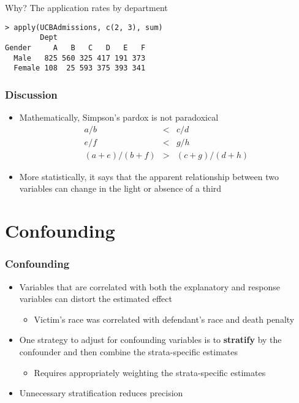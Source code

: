 \documentclass[aspectratio=169]{beamer}
\begin{document}
\begin{frame}[fragile]
Why? The application rates by department
\begin{verbatim}
> apply(UCBAdmissions, c(2, 3), sum)
        Dept
Gender     A   B   C   D   E   F
  Male   825 560 325 417 191 373
  Female 108  25 593 375 393 341
\end{verbatim}
\end{frame}

\begin{frame}\frametitle{Discussion}
\begin{itemize}
\item Mathematically, Simpson's pardox is not paradoxical
  \begin{eqnarray*}
    a / b & < & c / d\\
    e / f & < & g / h \\
    (a + e) / (b + f) & > & (c + g) / (d + h)
  \end{eqnarray*}
\item More statistically, it says that the apparent relationship between two
  variables can change in the light or absence of a third
\end{itemize}
\end{frame}

\section{Confounding}
\begin{frame}\frametitle{Confounding}
\begin{itemize}
\item Variables that are correlated with both the explanatory and response
  variables can distort the estimated effect
  \begin{itemize}
  \item Victim's race was correlated with defendant's race and death penalty
  \end{itemize}
\item One strategy to adjust for confounding variables is to {\bf stratify}
  by the confounder and then combine the strata-specific estimates
  \begin{itemize}
  \item Requires appropriately weighting the strata-specific estimates
  \end{itemize}
\item Unnecessary stratification reduces precision
\end{itemize}
\end{frame}
\end{document}
